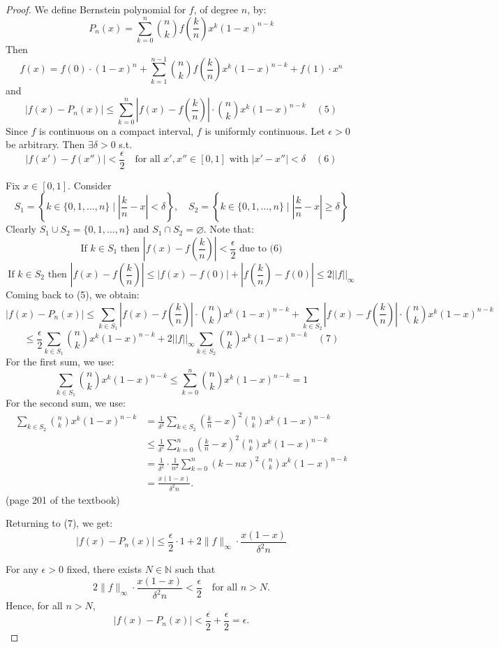 \begin{proof}
    We define Bernstein polynomial for $f$, of degree $n$, by:
\[
P_n(x) = \sum_{k=0}^{n} \binom{n}{k} f\left(\frac{k}{n}\right) x^k (1 - x)^{n-k}
\]
Then
\[
f(x) = f(0) \cdot (1 - x)^n + \sum_{k=1}^{n-1} \binom{n}{k} f\left(\frac{k}{n}\right) x^k (1 - x)^{n-k} + f(1) \cdot x^n
\]
and
\[
|f(x) - P_n(x)| \leq \sum_{k=0}^{n} |f(x) - f\left(\frac{k}{n}\right)| \cdot \binom{n}{k} x^k (1 - x)^{n-k} \quad (5)
\]
Since $f$ is continuous on a compact interval, $f$ is uniformly continuous. Let $\epsilon > 0$ be arbitrary. Then $\exists \delta > 0$ s.t.
\[
|f(x') - f(x'')| < \frac{\epsilon}{2} \quad \text{for all $x', x'' \in [0,1]$ with $|x' - x''| < \delta$} \quad (6)
\]

Fix $x \in [0,1]$. Consider
\[
S_1 = \left\{ k \in \{0,1,\ldots,n\} \;|\; \left|\frac{k}{n} - x\right| < \delta \right\}, \quad S_2 = \left\{ k \in \{0,1,\ldots,n\} \;|\; \left|\frac{k}{n} - x\right| \geq \delta \right\}
\]
Clearly $S_1 \cup S_2 = \{0,1,\ldots,n\}$ and $S_1 \cap S_2 = \varnothing$. Note that:
\[
\text{If } k \in S_1 \text{ then } |f(x) - f\left(\frac{k}{n}\right)| < \frac{\epsilon}{2} \text{ due to (6)}
\]
\[
\text{If } k \in S_2 \text{ then } |f(x) - f\left(\frac{k}{n}\right)| \leq |f(x) - f(0)| + |f\left(\frac{k}{n}\right) - f(0)| \leq 2||f||_{\infty}
\]
Coming back to (5), we obtain:
\[
|f(x) - P_n(x)| \leq \sum_{k \in S_1} |f(x) - f\left(\frac{k}{n}\right)| \cdot \binom{n}{k} x^k (1 - x)^{n-k} + \sum_{k \in S_2} |f(x) - f\left(\frac{k}{n}\right)| \cdot \binom{n}{k} x^k (1 - x)^{n-k}
\]
\[
\leq \frac{\epsilon}{2} \sum_{k \in S_1} \binom{n}{k} x^k (1 - x)^{n-k} + 2||f||_{\infty} \sum_{k \in S_2} \binom{n}{k} x^k (1 - x)^{n-k} \quad (7)
\]
For the first sum, we use:
\[
\sum_{k \in S_1} \binom{n}{k} x^k(1-x)^{n-k} \leq \sum_{k=0}^{n} \binom{n}{k} x^k(1-x)^{n-k} = 1
\]
For the second sum, we use:
\begin{align*}
\sum_{k \in S_2} \binom{n}{k} x^k(1-x)^{n-k} & = \frac{1}{\delta^2} \sum_{k \in S_2} \left(\frac{k}{n} - x\right)^2 \binom{n}{k} x^k(1-x)^{n-k} \\
& \leq \frac{1}{\delta^2} \sum_{k=0}^{n} \left(\frac{k}{n} - x\right)^2 \binom{n}{k} x^k(1-x)^{n-k} \\
& = \frac{1}{\delta^2} \cdot \frac{1}{n^2} \sum_{k=0}^{n} (k - nx)^2 \binom{n}{k} x^k(1-x)^{n-k} \\
& = \frac{x(1-x)}{\delta^2 n}.
\end{align*}
(page 201 of the textbook)

Returning to (7), we get:
\[
|f(x) - P_n(x)| \leq \frac{\epsilon}{2} \cdot 1 + 2\|f\|_{\infty} \cdot \frac{x(1-x)}{\delta^2 n}
\]

For any $\epsilon > 0$ fixed, there exists $N \in \mathbb{N}$ such that
\[
2\|f\|_{\infty} \cdot \frac{x(1-x)}{\delta^2 n} < \frac{\epsilon}{2} \quad \text{for all } n > N.
\]
Hence, for all $n > N$,
\[
|f(x) - P_n(x)| < \frac{\epsilon}{2} + \frac{\epsilon}{2} = \epsilon.
\]
\end{proof}